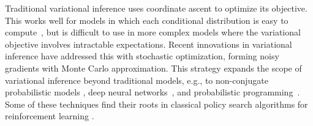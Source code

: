 \documentclass[]{article}
\begin{document}


Traditional variational inference uses coordinate ascent to optimize
its objective.  This works well for models in which each conditional
distribution is easy to compute~\citep{Ghahramani2001}, but is
difficult to use in more complex models where the variational
objective involves intractable expectations.  Recent
innovations in variational inference have addressed this with
stochastic optimization, forming noisy gradients with Monte Carlo
approximation. This strategy expands the scope of variational
inference beyond traditional models, e.g., to non-conjugate
probabilistic models
\citep{Carbonetto2009,Paisley2012,Salimans2013,Ranganath2014,Titsias2014_doubly},
deep neural
networks~\citep{Neal1992,Hinton1995,Mnih2014,Kingma2014,Ranganath2015},
and probabilistic programming~\citep{Wingate2013,Kucukelbir2015}. Some
of these techniques find their roots in classical policy search
algorithms for reinforcement learning
\citep{Williams1992,vandeMeent2016}.



\end{document}
